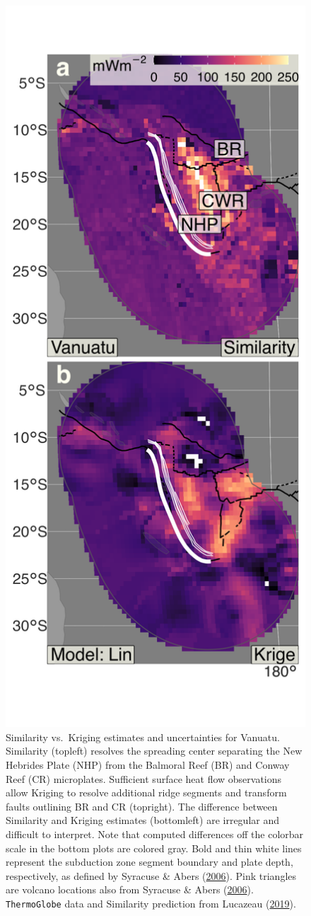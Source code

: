 \begin{figure}[htbp]

{\centering \includegraphics[width=0.45\linewidth,]{assets/figs/chpt3/VanuatuDiffComp} 

}

\caption[Similarity vs. Kriging estimates and uncertainties for Vanuatu]{Similarity vs.~Kriging estimates and uncertainties for Vanuatu. Similarity (topleft) resolves the spreading center separating the New Hebrides Plate (NHP) from the Balmoral Reef (BR) and Conway Reef (CR) microplates. Sufficient surface heat flow observations allow Kriging to resolve additional ridge segments and transform faults outlining BR and CR (topright). The difference between Similarity and Kriging estimates (bottomleft) are irregular and difficult to interpret. Note that computed differences off the colorbar scale in the bottom plots are colored gray. Bold and thin white lines represent the subduction zone segment boundary and plate depth, respectively, as defined by Syracuse \& Abers (\protect\hyperlink{ref-syracuse2006}{2006}). Pink triangles are volcano locations also from Syracuse \& Abers (\protect\hyperlink{ref-syracuse2006}{2006}). \texttt{ThermoGlobe} data and Similarity prediction from Lucazeau (\protect\hyperlink{ref-lucazeau2019}{2019}).}\label{fig:vanuatuDiff}
\end{figure}


